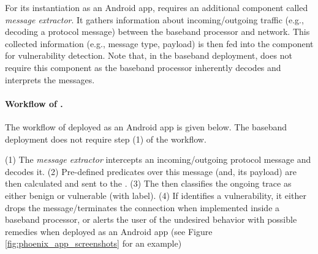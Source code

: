 For its instantiation as an Android app, \system requires an additional component called \textit{message extractor}.
It gathers information about incoming/outgoing traffic (e.g., decoding a protocol message)
between the baseband processor and network. This collected information
(e.g., message type, payload) is then fed into the \textit{\monitor} component
for vulnerability detection. Note that, in the baseband deployment, \system does
not require this component as the baseband processor inherently decodes and
interprets the messages.




\paragraph{Workflow of \systemtitle.}
The workflow of \system deployed as an Android app is given below.
The baseband deployment does not require step (1) of the workflow.


(1) The \textit{message extractor} intercepts
an incoming/outgoing protocol message and decodes it.
(2) Pre-defined predicates over this message
(and, its payload) are then calculated and sent to the \monitor.
(3) The \monitor then classifies the ongoing trace as either benign or
vulnerable (with label). %
(4) If \system identifies a vulnerability, it either drops the message/terminates
the connection when implemented inside a baseband processor, or alerts the user
of the undesired behavior with possible remedies when deployed as an Android
app (see Figure \ref{fig:phoenix_app_screenshots} for an example)
